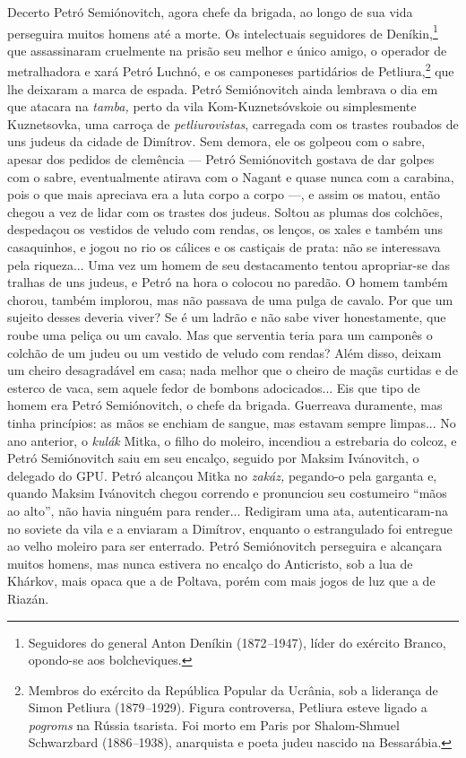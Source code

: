 Decerto Petró Semiónovitch, agora chefe da brigada, ao longo de sua vida
perseguira muitos homens até a morte. Os intelectuais seguidores de
Deníkin,\footnote{Seguidores do general Anton Deníkin
  (1872\emph{--}1947), líder do exército Branco, opondo-se aos
  bolcheviques.} que assassinaram cruelmente na prisão seu melhor e
único amigo, o operador de metralhadora e xará Petró Luchnó, e os
camponeses partidários de Petliura,\footnote{Membros do exército da
  República Popular da Ucrânia, sob a liderança de Simon Petliura
  (1879\emph{--}1929). Figura controversa, Petliura esteve ligado a
  \emph{pogroms} na Rússia tsarista. Foi morto em Paris por
  Shalom-Shmuel Schwarzbard (1886\emph{--}1938), anarquista e poeta
  judeu nascido na Bessarábia.} que lhe deixaram a marca de espada.
Petró Semiónovitch ainda lembrava o dia em que atacara na \emph{tamba,}
perto da vila Kom-Kuznetsóvskoie ou simplesmente Kuznetsovka, uma
carroça de \emph{petliurovistas}, carregada com os trastes roubados de
uns judeus da cidade de Dimítrov. Sem demora, ele os golpeou com o
sabre, apesar dos pedidos de clemência --- Petró Semiónovitch gostava de
dar golpes com o sabre, eventualmente atirava com o Nagant e quase nunca
com a carabina, pois o que mais apreciava era a luta corpo a corpo ---,
e assim os matou, então chegou a vez de lidar com os trastes dos judeus.
Soltou as plumas dos colchões, despedaçou os vestidos de veludo com
rendas, os lenços, os xales e também uns casaquinhos, e jogou no rio os
cálices e os castiçais de prata: não se interessava pela riqueza... Uma
vez um homem de seu destacamento tentou apropriar-se das tralhas de uns
judeus, e Petró na hora o colocou no paredão. O homem também chorou,
também implorou, mas não passava de uma pulga de cavalo. Por que um
sujeito desses deveria viver? Se é um ladrão e não sabe viver
honestamente, que roube uma peliça ou um cavalo. Mas que serventia teria
para um camponês o colchão de um judeu ou um vestido de veludo com
rendas? Além disso, deixam um cheiro desagradável em casa; nada melhor
que o cheiro de maçãs curtidas e de esterco de vaca, sem aquele fedor de
bombons adocicados... Eis que tipo de homem era Petró Semiónovitch, o
chefe da brigada. Guerreava duramente, mas tinha princípios: as mãos se
enchiam de sangue, mas estavam sempre limpas... No ano anterior, o
\emph{kulák} Mitka, o filho do moleiro, incendiou a estrebaria do
colcoz, e Petró Semiónovitch saiu em seu encalço, seguido por Maksim
Ivánovitch, o delegado do GPU. Petró alcançou Mitka no \emph{zakáz,}
pegando-o pela garganta e, quando Maksim Ivánovitch chegou correndo e
pronunciou seu costumeiro ``mãos ao alto'', não havia ninguém para
render... Redigiram uma ata, autenticaram-na no soviete da vila e a
enviaram a Dimítrov, enquanto o estrangulado foi entregue ao velho
moleiro para ser enterrado. Petró Semiónovitch perseguira e alcançara
muitos homens, mas nunca estivera no encalço do Anticristo, sob a lua de
Khárkov, mais opaca que a de Poltava, porém com mais jogos de luz que a
de Riazán.

